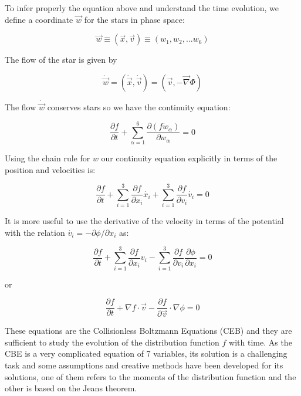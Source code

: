 To infer properly the equation above and understand the time evolution, we define a coordinate $\vec{w}$ for the stars in phase space:

\begin{equation}
\vec{w}\equiv (\vec{x},\vec{v})\equiv (w_{1},w_{2},...w_{6})
\end{equation}

The flow of the star is given by 

\begin{equation}
\dot{\vec{w}}= (\dot{\vec{x}},\dot{\vec{v}})=(\vec{v},-\vec{\nabla} \Phi)
\end{equation}

The flow $\dot{\vec{w}}$ conserves stars so we have the continuity equation:

\begin{equation}
\frac{\partial f}{\partial t}+\sum_{\alpha=1}^{6}\frac{\partial (f\dot{w}_{\alpha})}{\partial w_{\alpha}}=0
\end{equation}

Using the chain rule for $w$ our continuity equation explicitly in terms of the position and velocities is:

\begin{equation}
\frac{\partial f}{\partial t}+\sum_{i=1}^{3}\frac{\partial f}{\partial x_{i}}\dot{x_{i}}+\sum_{i=1}^{3}\frac{\partial f}{\partial v_{i}}\dot{v_{i}}=0
\end{equation}

It is more useful to use the derivative of the velocity in terms of the potential with the relation $\dot{v_{i}}=-\partial\phi / \partial x_{i}$ as:

\begin{equation}
\frac{\partial f}{\partial t}+\sum_{i=1}^{3}\frac{\partial f}{\partial x_{i}}v_{i}-\sum_{i=1}^{3}\frac{\partial f}{\partial v_{i}}\frac{\partial\phi}{\partial x_{i}}=0
\end{equation}

or

\begin{equation}
\frac{\partial f}{\partial t}+\nabla f\cdot\vec{v}-\frac{\partial f}{\partial\overrightarrow{v}}\cdot\nabla\phi=0
\end{equation}

These equations are the Collisionless Boltzmann Equations (CEB) and they are sufficient to study the evolution of the distribution function $f$ with time. As the CBE is a very complicated equation of 7 variables, its solution is a challenging task and some assumptions and creative methods have been developed for its solutions, one of them refers to the moments of the distribution function and the other is based on the Jeans theorem.

